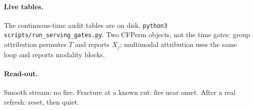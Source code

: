 \paragraph{Live tables.}
The continuous-time audit tables are on disk.
\texttt{python3 scripts/run\_serving\_gates.py}.
Two CFPerm objects, not the time gates: group attribution permutes \(T\) and reports \(X_j\);
multimodal attribution uses the same loop and reports modality blocks.

\paragraph{Read-out.}
Smooth stream: no fire.
Fracture at a known cut: fire near onset.
After a real refresh: reset, then quiet.
